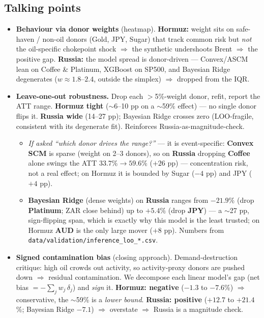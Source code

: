 \documentclass[11pt,a4paper]{article}
\newcommand{\highlight}[1]{\textcolor{accent}{\textbf{#1}}}
\begin{document}
\subsection{Talking points}
\begin{itemize}
  \item \highlight{Behaviour via donor weights} (heatmap). \highlight{Hormuz:} weight sits on safe-haven /
    non-oil donors (Gold, JPY, Sugar) that track common risk but \emph{not} the oil-specific chokepoint
    shock $\Rightarrow$ the synthetic undershoots Brent $\Rightarrow$ the positive gap. \highlight{Russia:}
    the model spread is donor-driven --- Convex/ASCM lean on Coffee \& Platinum, XGBoost on SP500, and
    Bayesian Ridge degenerates ($w \approx 1.8$--$2.4$, outside the simplex) $\Rightarrow$ dropped from the IQR.
  \item \highlight{Leave-one-out robustness.} Drop each $>$5\%-weight donor, refit, report the ATT range.
    \highlight{Hormuz tight} ($\sim$6--10 pp on a $\sim$59\% effect) --- no single donor flips it.
    \highlight{Russia wide} (14--27 pp); Bayesian Ridge crosses zero (LOO-fragile, consistent with its
    degenerate fit). Reinforces Russia-as-magnitude-check.
    \begin{itemize}\setlength\itemsep{0.15em}
      \item \textit{If asked ``which donor drives the range?''} --- it is event-specific:
        \textbf{Convex SCM} is sparse (weight on 2--3 donors), so on \textbf{Russia} dropping
        \textbf{Coffee} alone swings the ATT $33.7\%\!\to\!59.6\%$ ($+26$ pp) --- concentration risk, not a
        real effect; on Hormuz it is bounded by Sugar ($-4$ pp) and JPY ($+4$ pp).
      \item \textbf{Bayesian Ridge} (dense weights) on \textbf{Russia} ranges from $-21.9\%$ (drop
        \textbf{Platinum}; ZAR close behind) up to $+5.4\%$ (drop \textbf{JPY}) --- a $\sim$27 pp,
        sign-flipping span, which is exactly why this model is the least trusted; on Hormuz \textbf{AUD}
        is the only large mover ($+8$ pp). Numbers from \texttt{data/validation/inference\_loo\_*.csv}.
    \end{itemize}
  \item \highlight{Signed contamination bias} (closing approach). Demand-destruction critique: high oil
    crowds out activity, so activity-proxy donors are pushed down $\Rightarrow$ residual contamination. We
    decompose each linear model's gap (net bias $=-\sum_j w_j\,\delta_j$) and \emph{sign} it.
    \highlight{Hormuz: negative} ($-1.3$ to $-7.6$\%) $\Rightarrow$ conservative, the $\sim$59\% is a
    \emph{lower bound}. \highlight{Russia: positive} ($+12.7$ to $+21.4$\%; Bayesian Ridge $-7.1$)
    $\Rightarrow$ overstate $\Rightarrow$ Russia is a magnitude check.
\end{itemize}
\end{document}

